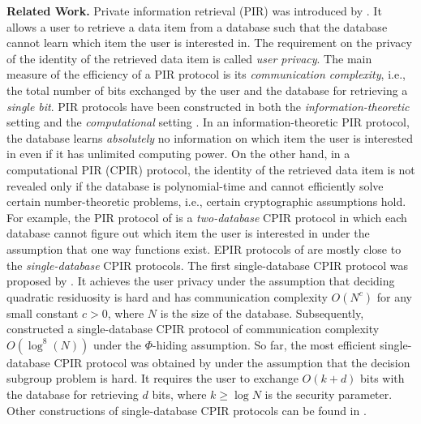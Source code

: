 \documentclass[JMC]{degruyter-journal}
\begin{document}
{\bf Related Work.} Private information retrieval (PIR) was
introduced by \cite{CGKS95}. It allows a user to retrieve a data
item from a  database  such that
 the database cannot learn which item the user is interested in.
The requirement on the privacy of the identity of the retrieved data
item is  called {\em user privacy}. The main measure of the
efficiency of a PIR protocol is its  {\em communication complexity},
i.e., the total number of bits exchanged by the user and the
database for retrieving a {\em single bit}.
 PIR protocols have been constructed in both the {\em information-theoretic} setting
  \cite{CGKS95,Amb97,BIKR02,BIK05,WY05,Yek07,Efr09,IS10,CFLWZ10} and the {\em computational}
  setting \cite{CG97,KO97,CMS99,KO00,YS01,Chang04,GR05,Lip05,GKL10}.
In an information-theoretic PIR protocol, the database learns {\em
absolutely}  no information on which item the user is interested in
even if it has unlimited computing power. On the other hand, in a
computational PIR (CPIR) protocol, the identity of the retrieved
data item is not revealed only if the database is polynomial-time
and cannot efficiently solve certain number-theoretic problems,
i.e., certain cryptographic assumptions hold. For example, the PIR
protocol of \cite{CG97} is a {\em two-database} CPIR protocol in
which each database cannot figure out which item the user is
interested in under the assumption that one way functions exist.
EPIR protocols of \cite{BCPT07,BC09} are mostly close to the {\em
single-database} CPIR protocols. The first single-database CPIR
protocol was proposed by \cite{KO97}. It achieves the user privacy
under the assumption that deciding quadratic residuosity is hard and
has communication complexity $O(N^c)$ for any small constant $c>0$,
where $N$ is the size of the database. Subsequently,  \cite{CMS99}
constructed  a single-database CPIR protocol of communication
complexity $O(\log^8(N))$  under the  $\Phi$-hiding assumption.  So
far, the most efficient single-database CPIR protocol was obtained
by \cite{GR05} under the assumption that the decision subgroup problem
is hard.  It requires the user to exchange $O(k+d)$ bits with the
database for retrieving $d$ bits, where $k\geq \log N$ is the
security parameter.
Other constructions of single-database CPIR  protocols can
be found in \cite{KO00,YS01,Chang04,GKL10}.
\end{document}
